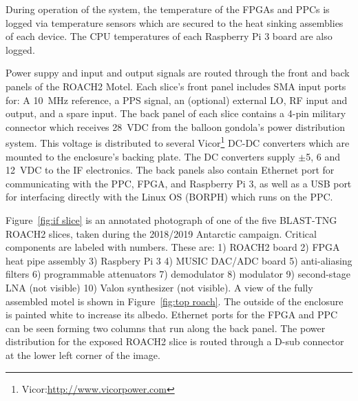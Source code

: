 During operation of the system, the temperature of the FPGAs and PPCs is logged via temperature sensors which are secured to the heat sinking assemblies of each device. The CPU temperatures of each Raspberry Pi 3 board are also logged.

Power suppy and input and output signals are routed through the front and back panels of the ROACH2 Motel. Each slice's front panel includes SMA input ports for: A 10~MHz reference, a PPS signal, an (optional) external LO, RF input and output, and a spare input. The back panel of each slice contains a 4-pin military connector which receives 28~VDC from the balloon gondola’s power distribution system. This voltage is distributed to several Vicor\footnote{Vicor:\url{http://www.vicorpower.com}} DC-DC converters which are mounted to the enclosure's backing plate. The DC converters supply $\pm$5, 6 and 12~VDC to the IF electronics. The back panels also contain Ethernet port for communicating with the PPC, FPGA, and Raspberry Pi 3, as well as a USB port for interfacing directly with the Linux OS (BORPH) which runs on the PPC\@.

Figure~\ref{fig:if slice} is an annotated photograph of one of the five BLAST-TNG ROACH2 slices, taken during the 2018/2019 Antarctic campaign. Critical components are labeled with numbers. These are: 1) ROACH2 board 2) FPGA heat pipe assembly 3) Raspbery Pi 3 4) MUSIC DAC/ADC board 5) anti-aliasing filters 6) programmable attenuators 7) demodulator 8) modulator 9) second-stage LNA (not visible) 10) Valon synthesizer (not visible). A view of the fully assembled motel is shown in Figure~\ref{fig:top roach}. The outside of the enclosure is painted white to increase its albedo. Ethernet ports for the FPGA and PPC can be seen forming two columns that run along the back panel. The power distribution for the exposed ROACH2 slice is routed through a D-sub connector at the lower left corner of the image.

